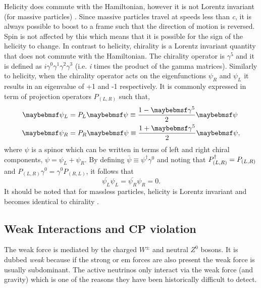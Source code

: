 Helicity does commute with the Hamiltonian, however it is not Lorentz invariant (for massive particles) \cite{Introduction_to_Particle_and_Astroparticle_Physics_book}. Since massive particles travel at speeds less than \textit{c}, it is always possible to boost to a frame such that the direction of motion is reversed. Spin is not affected by this which means that it is possible for the sign of the helicity to change. In contrast to helicity, chirality is a Lorentz invariant quantity that does not commute with the Hamiltonian. The chirality operator is $\gamma^5$ and it is defined as $i\gamma^0\gamma^1\gamma^2\gamma^3$ (i.e. \textit{i} times the product of the gamma matrices). Similarly to helicity, when the chirality operator acts on the eigenfunctions $\psi_R$ and $\psi_L$ it results in an eigenvalue of +1 and -1 respectively. It is commonly expressed in term of projection operators $P_{(L, R)}$ such that,
\begin{equation}
\begin{split}
    \psi_L &= P_L\psi \isdefined \frac{1-\gamma^5}{2}\psi \\
    \psi_R &= P_R\psi \isdefined \frac{1+\gamma^5}{2}\psi,
\end{split}
\end{equation}
where $\psi$ is a spinor which can be written in terms of left and right chiral components, $\psi = \psi_L + \psi_R$.
By defining $\overline{\psi} \equiv \psi^\dag \gamma^0$ and noting that $P_{(L,R)}^\dagger = P_{(L,R)}$ and $P_{(L,R)}\gamma^0 = \gamma^0P_{(R,L)}$, it follows that
\begin{equation}\label{eqn:chiral identity}
    \overline{\psi_L}\psi_L = \overline{\psi_R}\psi_R = 0.
\end{equation}
It should be noted that for massless particles, helicity is Lorentz invariant and becomes identical to chirality \cite{Fundamentals_of_Neutrino_Physics_and_Astrophysics}.

\subsection{Weak Interactions and CP violation}

The weak force is mediated by the charged $W^\pm$ and neutral $Z^0$ bosons. It is dubbed \textit{weak} because if the strong or \gls{em} forces are also present the weak force is usually subdominant. The active neutrinos only interact via the weak force (and gravity) which is one of the reasons they have been historically difficult to detect. 

